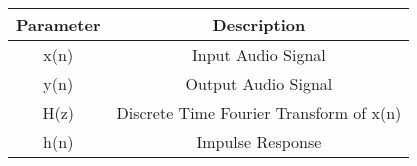 \begin{tabular}{|c|c|}
\hline
\textbf{Parameter} & \textbf{Description}\\
     \hline
     x(n) & Input Audio Signal \\
     \hline
     y(n) & Output Audio Signal\\ 
     \hline
     H(z) & Discrete Time Fourier Transform of x(n)\\
     \hline
     h(n) & Impulse Response\\
     \hline
\end{tabular}
